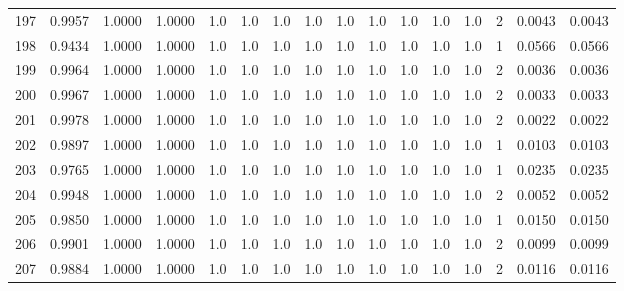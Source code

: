 \begin{tabular}{lrrrrrrrrrrrrrrr}
197 &      0.9957 &  1.0000 &  1.0000 &     1.0 &     1.0 &     1.0 &     1.0 &     1.0 &     1.0 &     1.0 &      1.0 &        1.0 &      2 &                    0.0043 &                     0.0043 \\
198 &      0.9434 &  1.0000 &  1.0000 &     1.0 &     1.0 &     1.0 &     1.0 &     1.0 &     1.0 &     1.0 &      1.0 &        1.0 &      1 &                    0.0566 &                     0.0566 \\
199 &      0.9964 &  1.0000 &  1.0000 &     1.0 &     1.0 &     1.0 &     1.0 &     1.0 &     1.0 &     1.0 &      1.0 &        1.0 &      2 &                    0.0036 &                     0.0036 \\
200 &      0.9967 &  1.0000 &  1.0000 &     1.0 &     1.0 &     1.0 &     1.0 &     1.0 &     1.0 &     1.0 &      1.0 &        1.0 &      2 &                    0.0033 &                     0.0033 \\
201 &      0.9978 &  1.0000 &  1.0000 &     1.0 &     1.0 &     1.0 &     1.0 &     1.0 &     1.0 &     1.0 &      1.0 &        1.0 &      2 &                    0.0022 &                     0.0022 \\
202 &      0.9897 &  1.0000 &  1.0000 &     1.0 &     1.0 &     1.0 &     1.0 &     1.0 &     1.0 &     1.0 &      1.0 &        1.0 &      1 &                    0.0103 &                     0.0103 \\
203 &      0.9765 &  1.0000 &  1.0000 &     1.0 &     1.0 &     1.0 &     1.0 &     1.0 &     1.0 &     1.0 &      1.0 &        1.0 &      1 &                    0.0235 &                     0.0235 \\
204 &      0.9948 &  1.0000 &  1.0000 &     1.0 &     1.0 &     1.0 &     1.0 &     1.0 &     1.0 &     1.0 &      1.0 &        1.0 &      2 &                    0.0052 &                     0.0052 \\
205 &      0.9850 &  1.0000 &  1.0000 &     1.0 &     1.0 &     1.0 &     1.0 &     1.0 &     1.0 &     1.0 &      1.0 &        1.0 &      1 &                    0.0150 &                     0.0150 \\
206 &      0.9901 &  1.0000 &  1.0000 &     1.0 &     1.0 &     1.0 &     1.0 &     1.0 &     1.0 &     1.0 &      1.0 &        1.0 &      2 &                    0.0099 &                     0.0099 \\
207 &      0.9884 &  1.0000 &  1.0000 &     1.0 &     1.0 &     1.0 &     1.0 &     1.0 &     1.0 &     1.0 &      1.0 &        1.0 &      2 &                    0.0116 &                     0.0116 \\

\end{tabular}
